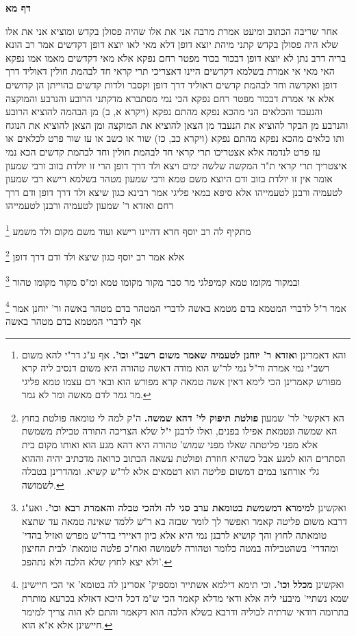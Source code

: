 \documentclass[12pt, openany]{book}
\newcommand{\sethebfont}{
\fontsize{10.5pt}{21.0pt} \selectfont
}
\newcommand{\twocol}[1]{
	{\sethebfont \begin{multicols}{2}
			#1
	\end{multicols}}	
}
\newcommand{\sectname}{}
\newcommand{\newsection}[1]{
	\addcontentsline{toc}{section}{#1}
	\renewcommand{\sectname}{#1}	
	\vspace{-\baselineskip}
	\begin{center}
		\textbf{%
\fontsize{16pt}{16pt}\selectfont
			#1}
	\end{center}
	\vspace{-\baselineskip}
	\nopagebreak
}
\newcommand{\footnotecomment}[1]{
	\renewcommand\thefootnote{}
	\footnote{#1}}
\newcommand{\commenta}[1]{\footnotecomment{#1}}
\begin{document}
\newsection{דף מא}
\twocol{אחר שריבה הכתוב ומיעט אמרת מרבה אני את אלו שהיה פסולן בקדש ומוציא אני את אלו שלא היה פסולן בקדש 
קתני מיהת יוצא דופן דלא מאי לאו יוצא דופן דקדשים אמר רב הונא בריה דרב נתן לא יוצא דופן דבכור 
בכור מפטר רחם נפקא 
אלא מאי דקדשים מאמו אמו נפקא 
האי מאי אי אמרת בשלמא דקדשים היינו דאצריכי תרי קראי חד לבהמת חולין דאוליד דרך דופן ואקדשה
וחד לבהמת קדשים דאוליד דרך דופן וקסבר ולדות קדשים בהוייתן הן קדושים אלא אי אמרת דבכור מפטר רחם נפקא 
הכי נמי מסתברא מדקתני הרובע והנרבע והמוקצה והנעבד והכלאים
הני מהכא נפקא מהתם נפקא (ויקרא א, ב) מן הבהמה להוציא הרובע והנרבע מן הבקר להוציא את הנעבד מן הצאן להוציא את המוקצה ומן הצאן להוציא את הנוגח 
ותו כלאים מהכא נפקא מהתם נפקא (ויקרא כב, כז) שור או כשב או עז שור פרט לכלאים או עז פרט לנדמה 
אלא אצטריכו תרי קראי חד לבהמת חולין וחד לבהמת קדשים הכא נמי איצטריך תרי קראי 
ת"ר המקשה שלשה ימים ויצא ולד דרך דופן הרי זו יולדת בזוב ורבי שמעון אומר אין זו יולדת בזוב ודם היוצא משם טמא ורבי שמעון מטהר 
בשלמא רישא רבי שמעון לטעמיה ורבנן לטעמייהו אלא סיפא במאי פליגי אמר רבינא כגון שיצא ולד דרך דופן
ודם דרך רחם ואזדא ר' שמעון לטעמיה ורבנן לטעמייהו 
\commenta{והא דאמרינן \textbf{ואזדא ר' יוחנן לטעמיה שאמר משום רשב"י וכו'.} אף ע"ג דר"י להא משום רשב"י נמי אמרה ור"ל נמי לר"ש הוא מודה דאשה טהורה היא משום דנסיב ליה קרא מפורש קאמרינן הכי לימא דאין אשה טמאה קרא מפורש הוא ובאי דם עצמו טמא פליגי מר גמר לדם מאשה ומר לא גמר. }
מתקיף לה רב יוסף חדא דהיינו רישא ועוד משם מקום ולד משמע 
\commenta{הא דאקשי' לר' שמעון \textbf{פולטת תיפוק לי' דהא שמשה.} ה"ק למה לי טומאה פולטת בחוץ הא שמשה ונטמאת אפילו בפנים, ואלו לרבנן י"ל שלא הצריכה התורה טבילת משמשת אלא מפני פליטתה שאלו מפני שמוש' טהורה היא דהא מגע הוא ואותו מקום בית הסתרים הוא למגע אבל כשהיא חוזרת ופולטת עשאה הכתוב כרואה מדכתיב יהיה וההוא גלי אורחצו במים דמשום פליטה הוא דטמאים אלא לר"ש קשיא. ומהדרינן בטבלה לשמושה. }
אלא אמר רב יוסף כגון שיצא ולד ודם דרך דופן
\commenta{ואקשינן \textbf{למימרא דמשמשת בטומאת ערב סגי לה ולהכי טבלה והאמרת רבא וכו'.} ואע"ג דרבא משום פליטה קאמר ואפשר לך לומר שבזה בא ר"ש ללמד שאינה טמאה עד שתצא טומאתה לחוץ והך קושיא לרבנן נמי היא אלא כיון דאיירי בדר"ש מפרש ואזיל בהדי' ומהדרי' בשהטבילוה במטה כלומר וטהורה לשמושה ואח"כ פלטה טומאת' לבית החיצון ולא יצא לחוץ שלא הלכה ולא נתהפכ'. }
ובמקור מקומו טמא קמיפלגי מר סבר מקור מקומו טמא ומ"ס מקור מקומו טהור 
\commenta{ואקשינן \textbf{מכלל וכו'.} וכי תימא דילמא אשתייר ומספיק' אסרינן לה בטומא' אי הכי חיישינן שמא נשתיי' מיבעי ליה אלא ודאי מדלא קאמר הכי ש"מ דכל היכא דאזלא בכרעא מותרת בתרומה דודאי שדתיה לכוליה ודרבא בשלא הלכה הוא דקאמר והתם לא הוה צריך למימר חיישינן אלא א"א הוא. }
אמר ר"ל לדברי המטמא בדם מטמא באשה לדברי המטהר בדם מטהר באשה ור' יוחנן אמר אף לדברי המטמא בדם מטהר באשה 
}
\end{document}
